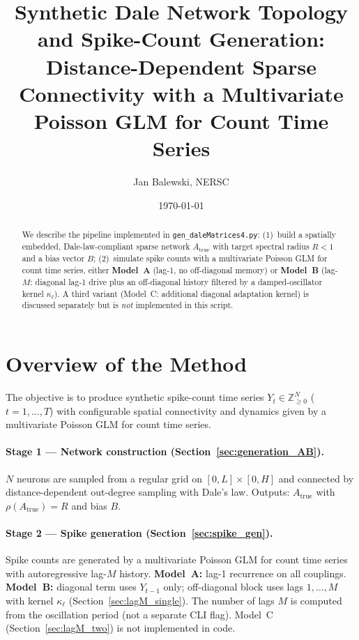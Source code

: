 \documentclass[11pt]{article}
\title{Synthetic Dale Network Topology and Spike-Count Generation:\\
Distance-Dependent Sparse Connectivity with a Multivariate Poisson GLM for Count Time Series}
\author{Jan Balewski, NERSC}
\date{\today}
\begin{document}
\maketitle

\begin{abstract}
We describe the pipeline implemented in \texttt{gen\_daleMatrices4.py}:
(1)~build a spatially embedded, Dale-law-compliant sparse network
$A_{\text{true}}$ with target spectral radius $R<1$ and a bias vector $B$;
(2)~simulate spike counts with a multivariate Poisson GLM for count time series,
either
\textbf{Model~A} (lag-1, no off-diagonal memory) or
\textbf{Model~B} (lag-$M$: diagonal lag-1 drive plus an off-diagonal
history filtered by a damped-oscillator kernel $\kappa_\ell$).
A third variant (Model~C: additional diagonal adaptation kernel) is
discussed separately but is \emph{not} implemented in this script.
\end{abstract}

\tableofcontents
\newpage

\section{Overview of the Method}
\label{sec:overview}

The objective is to produce synthetic spike-count time series
$Y_t\in\mathbb{Z}_{\geq 0}^{N}$ ($t=1,\dots,T$) with configurable
spatial connectivity and dynamics given by a multivariate Poisson GLM
for count time series.

\paragraph{Stage 1 --- Network construction (Section~\ref{sec:generation_AB}).}
$N$ neurons are sampled from a regular grid on $[0,L]\times[0,H]$ and
connected by distance-dependent out-degree sampling with Dale's law.
Outputs: $A_{\text{true}}$ with $\rho(A_{\text{true}})=R$ and bias $B$.

\paragraph{Stage 2 --- Spike generation (Section~\ref{sec:spike_gen}).}
Spike counts are generated by a multivariate Poisson GLM for count time
series with autoregressive lag-$M$ history.
\textbf{Model~A:} lag-1 recurrence on all couplings.
\textbf{Model~B:} diagonal term uses $Y_{t-1}$ only; off-diagonal
block uses lags $1,\dots,M$ with kernel $\kappa_\ell$
(Section~\ref{sec:lagM_single}). The number of lags $M$ is computed from
the oscillation period (not a separate CLI flag).
Model~C (Section~\ref{sec:lagM_two}) is not implemented in code.
\end{document}
